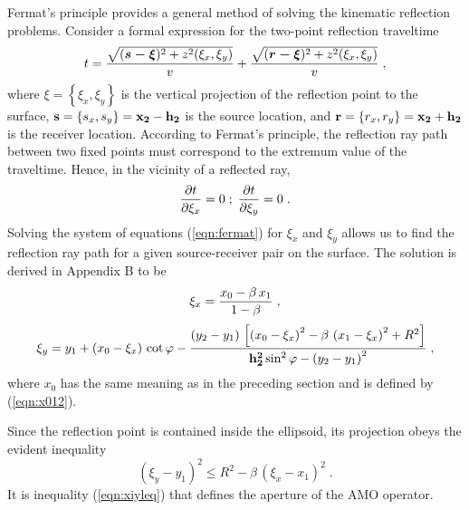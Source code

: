 Fermat's principle provides a general method of solving the kinematic reflection problems. Consider a formal expression for the two-point
reflection traveltime 
\begin{equation}
t={\sqrt{
(\mbox{\boldmath{$s - \xi$}})^2+z^2(\xi_x,\xi_y)}
\over v}+
{\sqrt{
(\mbox{\boldmath{$r - \xi$}})^2+z^2(\xi_x,\xi_y)}
\over v}\;,
\label{eqn:reflecttt}
\end{equation}  
where \boldmath$\xi=$\unboldmath$\left\{\xi_x,\xi_y\right\}$ is the vertical
projection of the reflection 
point to the surface, ${\bf s}=\left\{s_x,s_y\right\}={\bf x_2-h_2}$
is the source location, and 
${\bf r}=\left\{r_x,r_y\right\}={\bf x_2+h_2}$ is the receiver location.
According to Fermat's principle, the reflection ray path between two
fixed points must correspond to the
extremum value of the traveltime. Hence, in the vicinity of a
reflected ray,
\begin{equation}
{\partial t \over \partial \xi_x}=0\;;\;
{\partial t \over \partial \xi_y}=0\;.
\label{eqn:fermat}
\end{equation}   
Solving the system of equations (\ref{eqn:fermat}) for $\xi_x$ and $\xi_y$
allows us to find the reflection ray path for a given source-receiver
pair on the surface. The solution is derived in Appendix B to be
\begin{equation}
\xi_x={{x_0-\beta\,x_1}\over{1-\beta}}\;,
\label{eqn:x02xi}
\end{equation} 
\begin{equation}
\xi_y=y_1+\left(x_0-\xi_x\right)\,\cot{\varphi}-
{{\left(y_2-y_1\right)\,\left[
\left(x_0-\xi_x\right)^2-\beta\,\left(x_1-\xi_x\right)^2+R^2
\right]}\over
{{\bf h_2^2}\sin^2{\varphi}-\left(y_2-y_1\right)^2}}\;,
\label{eqn:xiy}
\end{equation} 
where $x_0$ has the same meaning as in the preceding section
and is defined by (\ref{eqn:x012}).
\par
Since the reflection point is contained inside the ellipsoid,
its projection obeys the evident inequality
\begin{equation}
\left(\xi_y-y_1\right)^2\leq R^2-\beta\,\left(\xi_x-x_1\right)^2\;.
\label{eqn:xiyleq}
\end{equation}
It is inequality (\ref{eqn:xiyleq}) that defines the aperture of the AMO
operator.

